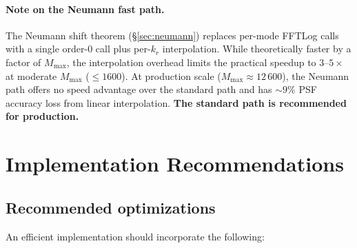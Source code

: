 \documentclass[11pt,a4paper]{article}
\begin{document}
\paragraph{Note on the Neumann fast path.}
The Neumann shift theorem (\S\ref{sec:neumann}) replaces per-mode FFTLog calls
with a single order-0 call plus per-$k_r$ interpolation.  While theoretically
faster by a factor of $M_{\max}$, the interpolation overhead limits the practical
speedup to $3$--$5\times$ at moderate $M_{\max}$ ($\le 1600$).  At production
scale ($M_{\max} \approx 12\,600$), the Neumann path offers no speed advantage
over the standard path and has ${\sim}9\%$ PSF accuracy loss from linear
interpolation.  \textbf{The standard path is recommended for production.}


\section{Implementation Recommendations}
\label{sec:implementation}

\subsection{Recommended optimizations}

An efficient implementation should incorporate the following:
\end{document}
